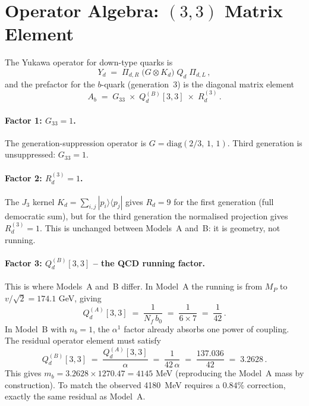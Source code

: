 \documentclass[11pt]{article}
\begin{document}
\section{Operator Algebra: $(3,3)$ Matrix Element}

The Yukawa operator for down-type quarks is
\begin{equation}
  Y_d \;=\; \Pi_{d,R}\;\bigl(G \otimes K_d\bigr)\;Q_d\;\Pi_{d,L}\,,
\end{equation}
and the prefactor for the $b$-quark (generation~3) is the diagonal matrix element
\begin{equation}
  A_b \;=\; G_{33}\;\times\; Q_d^{(B)}[3,3]\;\times\; R_d^{(3)}\,.
\end{equation}

\paragraph{Factor 1: $G_{33} = 1$.}
The generation-suppression operator is $G = \mathrm{diag}(2/3,\,1,\,1)$.
Third generation is unsuppressed: $G_{33} = 1$.

\paragraph{Factor 2: $R_d^{(3)} = 1$.}
The $J_3$ kernel $K_d = \sum_{i,j}|p_i\rangle\langle p_j|$ gives $R_d = 9$
for the first generation (full democratic sum), but for the third generation
the normalised projection gives $R_d^{(3)} = 1$.  This is unchanged between
Models~A and~B: it is geometry, not running.

\paragraph{Factor 3: $Q_d^{(B)}[3,3]$ -- the QCD running factor.}
This is where Models~A and~B differ.  In Model~A the running is from $M_P$
to $v/\sqrt{2} = 174.1$ GeV, giving
\[
  Q_d^{(A)}[3,3] \;=\; \frac{1}{N_f\,b_0} \;=\; \frac{1}{6\times 7}
  \;=\; \frac{1}{42}\,.
\]
In Model~B with $n_b = 1$, the $\alpha^1$ factor already absorbs one power
of coupling.  The residual operator element must satisfy
\[
  Q_d^{(B)}[3,3] \;=\; \frac{Q_d^{(A)}[3,3]}{\alpha}
  \;=\; \frac{1}{42\,\alpha}
  \;=\; \frac{137.036}{42}
  \;=\; 3.2628\,.
\]
This gives $m_b = 3.2628 \times 1270.47 = 4145$ MeV (reproducing the
Model~A mass by construction).  To match the observed 4180~MeV requires
a $0.84\%$ correction, exactly the same residual as Model~A.
\end{document}
